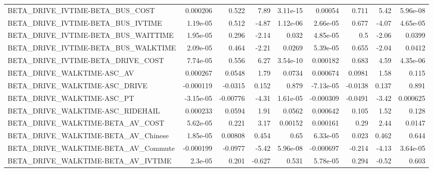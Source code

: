 \begin{tabular}{lrrrrrrrr}
BETA\_DRIVE\_IVTIME-BETA\_BUS\_COST                    &    0.000206 &        0.522 &     7.89 & 3.11e-15 &    0.00054 &       0.711 &         5.42 &      5.96e-08 \\
BETA\_DRIVE\_IVTIME-BETA\_BUS\_IVTIME                  &    1.19e-05 &        0.512 &    -4.87 & 1.12e-06 &   2.66e-05 &       0.677 &        -4.07 &      4.65e-05 \\
BETA\_DRIVE\_IVTIME-BETA\_BUS\_WAITTIME                &    1.95e-05 &        0.296 &    -2.14 &    0.032 &   4.85e-05 &         0.5 &        -2.06 &        0.0399 \\
BETA\_DRIVE\_IVTIME-BETA\_BUS\_WALKTIME                &    2.09e-05 &        0.464 &    -2.21 &   0.0269 &   5.39e-05 &       0.655 &        -2.04 &        0.0412 \\
BETA\_DRIVE\_IVTIME-BETA\_DRIVE\_COST                  &    7.74e-05 &        0.556 &     6.27 & 3.54e-10 &   0.000182 &       0.683 &         4.59 &      4.35e-06 \\
BETA\_DRIVE\_WALKTIME-ASC\_AV                         &    0.000267 &       0.0548 &     1.79 &   0.0734 &   0.000674 &      0.0981 &         1.58 &         0.115 \\
BETA\_DRIVE\_WALKTIME-ASC\_DRIVE                      &   -0.000119 &      -0.0315 &    0.152 &    0.879 &  -7.13e-05 &     -0.0138 &        0.137 &         0.891 \\
BETA\_DRIVE\_WALKTIME-ASC\_PT                         &   -3.15e-05 &     -0.00776 &    -4.31 & 1.61e-05 &  -0.000309 &     -0.0491 &        -3.42 &      0.000625 \\
BETA\_DRIVE\_WALKTIME-ASC\_RIDEHAIL                   &    0.000233 &       0.0594 &     1.91 &   0.0562 &   0.000642 &       0.105 &         1.52 &         0.128 \\
BETA\_DRIVE\_WALKTIME-BETA\_AV\_COST                   &    5.62e-05 &        0.221 &     3.17 &  0.00152 &   0.000161 &        0.29 &         2.44 &        0.0147 \\
BETA\_DRIVE\_WALKTIME-BETA\_AV\_Chinese                &    1.85e-05 &      0.00808 &    0.454 &     0.65 &   6.33e-05 &       0.023 &        0.462 &         0.644 \\
BETA\_DRIVE\_WALKTIME-BETA\_AV\_Commute                &   -0.000199 &      -0.0977 &    -5.42 & 5.96e-08 &  -0.000697 &      -0.214 &        -4.13 &      3.64e-05 \\
BETA\_DRIVE\_WALKTIME-BETA\_AV\_IVTIME                 &     2.3e-05 &        0.201 &   -0.627 &    0.531 &   5.78e-05 &       0.294 &        -0.52 &         0.603 \\

\end{tabular}
